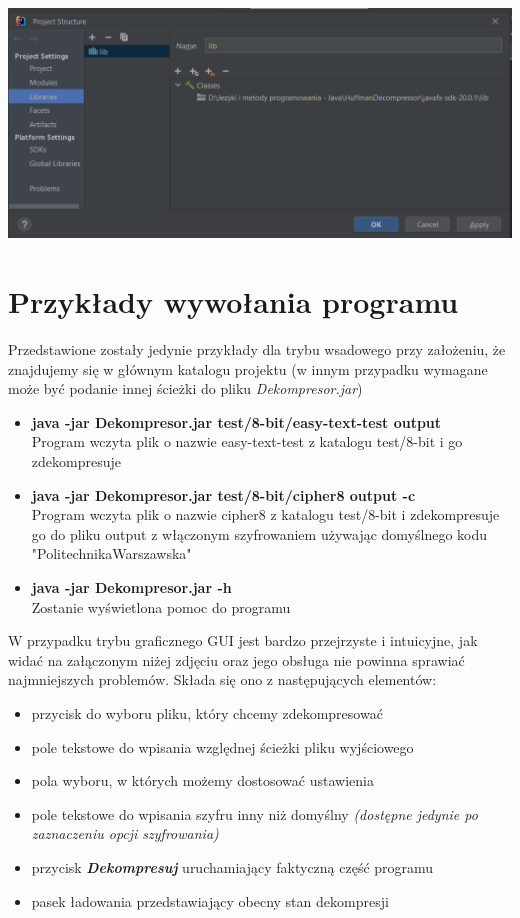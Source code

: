\documentclass[]{article}
\begin{document}
\includegraphics[width=\textwidth]{javafx.png}

\section{Przykłady wywołania programu}\label{header-n233}
Przedstawione zostały jedynie przykłady dla trybu wsadowego przy założeniu, że znajdujemy się w głównym katalogu projektu (w innym przypadku wymagane może być podanie innej ścieżki do pliku \textit{Dekompresor.jar})
\begin{itemize}
\item
\textbf{java -jar Dekompresor.jar test/8-bit/easy-text-test output}
\\Program wczyta plik o nazwie easy-text-test z katalogu test/8-bit i go zdekompresuje
\item
\textbf{java -jar Dekompresor.jar test/8-bit/cipher8 output -c}
\\Program wczyta plik o nazwie cipher8 z katalogu test/8-bit i zdekompresuje go do pliku output z włączonym szyfrowaniem używając domyślnego kodu "Politechnika\textunderscore Warszawska"
\item
\textbf{java -jar Dekompresor.jar -h}
\\Zostanie wyświetlona pomoc do programu
\end{itemize}
W przypadku trybu graficznego GUI jest bardzo przejrzyste i intuicyjne, jak widać na załączonym niżej zdjęciu oraz jego obsługa nie powinna sprawiać najmniejszych problemów. Składa się ono z następujących elementów:
\begin{itemize}
\item
przycisk do wyboru pliku, który chcemy zdekompresować
\item
pole tekstowe do wpisania względnej ścieżki pliku wyjściowego
\item
pola wyboru, w których możemy dostosować ustawienia
\item 
pole tekstowe do wpisania szyfru inny niż domyślny \textit{(dostępne jedynie po zaznaczeniu opcji szyfrowania)}
\item 
przycisk \textbf{\textit{Dekompresuj}} uruchamiający faktyczną część programu
\item 
pasek ładowania przedstawiający obecny stan dekompresji
\end{itemize}\\\\
\end{document}
